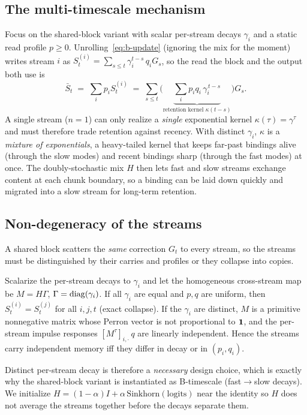\documentclass[11pt,letterpaper,logo]{yalearxiv}
\begin{document}
\subsection{The multi-timescale mechanism}
Focus on the shared-block variant with scalar per-stream decays $\gamma_i$ and a
static read profile $p \ge 0$. Unrolling~\eqref{eq:b-update} (ignoring the mix for
the moment) writes stream $i$ as $S_t^{(i)} = \sum_{s\le t} \gamma_i^{t-s}\, q_i
G_s$, so the read the block and the output both use is
\begin{equation}
  \bar S_t \;=\; \sum_i p_i S_t^{(i)}
           \;=\; \sum_{s \le t} \Big(\underbrace{\textstyle\sum_i p_i q_i\, \gamma_i^{\,t-s}}_{\text{retention kernel } \kappa(t-s)}\Big) G_s .
  \label{eq:mixexp}
\end{equation}
A single stream ($n=1$) can only realize a \emph{single} exponential kernel
$\kappa(\tau) = \gamma^{\tau}$ and must therefore trade retention against
recency. With distinct $\gamma_i$, $\kappa$ is a \emph{mixture of exponentials}, a
heavy-tailed kernel that keeps far-past bindings alive (through the slow modes) and
recent bindings sharp (through the fast modes) at once. The doubly-stochastic mix
$H$ then lets fast and slow streams exchange content at each chunk boundary, so a
binding can be laid down quickly and migrated into a slow stream for long-term
retention.

\subsection{Non-degeneracy of the streams}
A shared block scatters the \emph{same} correction $G_t$ to every stream, so the
streams must be distinguished by their carries and profiles or they collapse into
copies.

\begin{proposition}
\label{prop:collapse}
Scalarize the per-stream decays to $\gamma_i$ and let the homogeneous cross-stream
map be $M = H\Gamma$, $\Gamma = \operatorname{diag}(\gamma_i)$. If all $\gamma_i$ are equal and
$p,q$ are uniform, then $S_t^{(i)} = S_t^{(j)}$ for all $i,j,t$ (exact collapse).
If the $\gamma_i$ are distinct, $M$ is a primitive nonnegative matrix whose Perron
vector is not proportional to $\mathbf 1$, and the per-stream impulse responses
$[M^\tau]_{i,\cdot}\,q$ are linearly independent. Hence the streams carry
independent memory iff they differ in decay or in $(p_i,q_i)$.
\end{proposition}

Distinct per-stream decay is therefore a \emph{necessary} design choice, which is
exactly why the shared-block variant is instantiated as B-timescale (fast$\to$slow
decays). We initialize $H = (1-\alpha)I + \alpha\,\mathrm{Sinkhorn}(\text{logits})$
near the identity so $H$ does not average the streams together before the decays
separate them.
\end{document}
